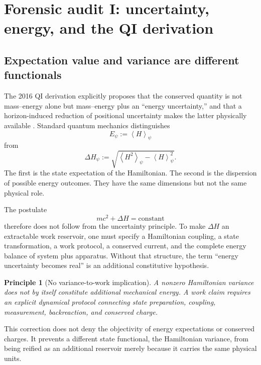 \documentclass[11pt]{article}
\newtheorem{principle}{Principle}
\newcommand{\avg}[1]{\left\langle #1\right\rangle}
\begin{document}
\section{Forensic audit I: uncertainty, energy, and the QI derivation}
\label{sec:uncertainty_audit}

\subsection{Expectation value and variance are different functionals}

The 2016 QI derivation explicitly proposes that the conserved quantity is not mass--energy alone but mass--energy plus an ``energy uncertainty,'' and that a horizon-induced reduction of positional uncertainty makes the latter physically available \cite{McCulloch2016}. Standard quantum mechanics distinguishes
\begin{equation}
    E_{\psi}:=\avg{H}_{\psi}
\end{equation}
from
\begin{equation}
    \Delta H_{\psi}
    :=\sqrt{\avg{H^{2}}_{\psi}-\avg{H}_{\psi}^{2}}.
    \label{eq:energy_variance}
\end{equation}
The first is the state expectation of the Hamiltonian. The second is the dispersion of possible energy outcomes. They have the same dimensions but not the same physical role.

The postulate
\begin{equation}
    mc^{2}+\Delta H=\mathrm{constant}
    \label{eq:qi_energy_postulate}
\end{equation}
therefore does not follow from the uncertainty principle. To make \(\Delta H\) an extractable work reservoir, one must specify a Hamiltonian coupling, a state transformation, a work protocol, a conserved current, and the complete energy balance of system plus apparatus. Without that structure, the term ``energy uncertainty becomes real'' is an additional constitutive hypothesis.

\begin{principle}[No variance-to-work implication]
A nonzero Hamiltonian variance does not by itself constitute additional mechanical energy. A work claim requires an explicit dynamical protocol connecting state preparation, coupling, measurement, backreaction, and conserved charge.
\end{principle}

This correction does not deny the objectivity of energy expectations or conserved charges. It prevents a different state functional, the Hamiltonian variance, from being reified as an additional reservoir merely because it carries the same physical units.
\end{document}
